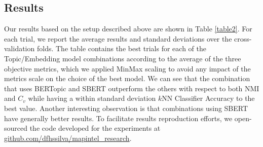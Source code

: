 \documentclass[a4paper]{article}
\begin{document}
\subsection{Results}
Our results based on the setup described above are shown in Table \ref{table2}. For each trial, we report the average results and standard deviations over the cross-validation folds. The table contains the best trials for each of the Topic/Embedding model combinations according to the average of the three objective metrics, which we applied MinMax scaling to avoid any impact of the metrics scale on the choice of the best model. We can see that the combination that uses BERTopic and SBERT outperform the others with respect to both NMI and $C_v$ while having a within standard deviation $k$NN Classifier Accuracy to the best value. Another interesting observation is that combinations using SBERT have generally better results. To facilitate results reproduction efforts, we open-sourced the code developed for the experiments at \href{https://github.com/dfhssilva/mapintel_research}{github.com/dfhssilva/mapintel\_research}.

\begin{table}[H]
  \centering
  \caption{Hyperparameter tuning best trials per topic and embedding model according to the MinMax average of the multiple objective metrics.}
  \label{table2}
\end{table}
\end{document}
